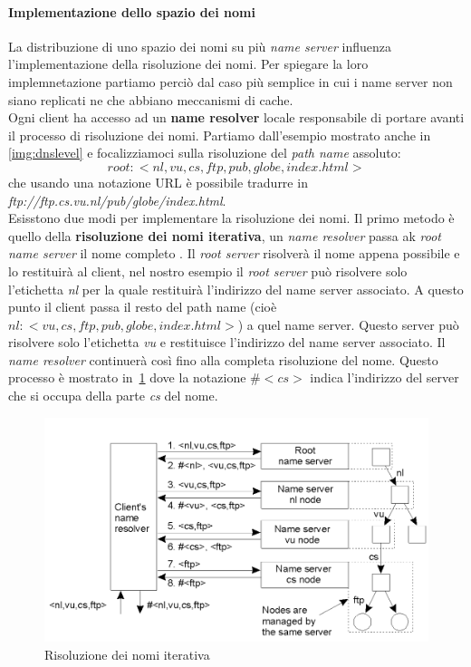\paragraph{Implementazione dello spazio dei nomi}
La distribuzione di uno spazio dei nomi su più \emph{name server} influenza l'implementazione della risoluzione dei nomi. Per spiegare la loro implemnetazione partiamo perciò dal caso più semplice in cui i name server non siano replicati ne che abbiano meccanismi di cache.\\
Ogni client ha accesso ad un \textbf{name resolver} locale responsabile di portare avanti il processo di risoluzione dei nomi. Partiamo dall'esempio mostrato anche in \figurename\,\ref{img:dnslevel} e focalizziamoci sulla risoluzione del \emph{path name} assoluto:
$$root:<nl,vu,cs,ftp,pub,globe,index.html>$$
che usando una notazione URL è possibile tradurre in \emph{ftp://ftp.cs.vu.nl/pub/globe/index.html}.\\
Esisstono due modi per implementare la risoluzione dei nomi. Il primo metodo è quello della \textbf{risoluzione dei nomi iterativa}, un \emph{name resolver} passa ak \emph{root name server} il nome completo . Il \emph{root server} risolverà il nome appena possibile e lo restituirà al client, nel nostro esempio il \emph{root server} può risolvere solo l'etichetta \emph{nl} per la quale restituirà l'indirizzo del name server associato. A questo punto il client passa il resto del path name (cioè $nl:<vu,cs,ftp,pub,globe,index.html>$) a quel name server. Questo server può risolvere solo l'etichetta \emph{vu} e restituisce l'indirizzo del name server associato. Il \emph{name resolver} continuerà così fino alla completa risoluzione del nome. Questo processo è mostrato in \figurename\,\ref{img:iterativa} dove la notazione $\#<cs>$ indica l'indirizzo del server che si occupa della parte \emph{cs} del nome.\\
\begin{figure}[htb]
\centering
\includegraphics[scale=0.45]{img/iterativa.png}
\caption{Risoluzione dei nomi iterativa}\label{img:iterativa}
\end{figure}

